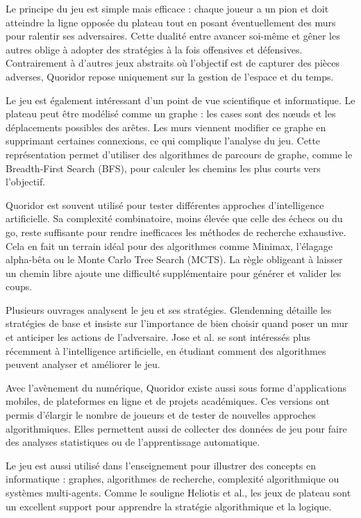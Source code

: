 \documentclass[a4paper]{article}
\begin{document}
Le principe du jeu est simple mais efficace : chaque joueur a un pion et doit atteindre la ligne opposée du plateau tout en posant éventuellement des murs pour ralentir ses adversaires. Cette dualité entre avancer soi-même et gêner les autres oblige à adopter des stratégies à la fois offensives et défensives. Contrairement à d’autres jeux abstraits où l’objectif est de capturer des pièces adverses, Quoridor repose uniquement sur la gestion de l’espace et du temps.

Le jeu est également intéressant d’un point de vue scientifique et informatique. Le plateau peut être modélisé comme un graphe : les cases sont des nœuds et les déplacements possibles des arêtes. Les murs viennent modifier ce graphe en supprimant certaines connexions, ce qui complique l’analyse du jeu. Cette représentation permet d’utiliser des algorithmes de parcours de graphe, comme le Breadth-First Search (BFS), pour calculer les chemins les plus courts vers l’objectif.

Quoridor est souvent utilisé pour tester différentes approches d’intelligence artificielle. Sa complexité combinatoire, moins élevée que celle des échecs ou du go, reste suffisante pour rendre inefficaces les méthodes de recherche exhaustive. Cela en fait un terrain idéal pour des algorithmes comme Minimax, l’élagage alpha-bêta ou le Monte Carlo Tree Search (MCTS). La règle obligeant à laisser un chemin libre ajoute une difficulté supplémentaire pour générer et valider les coups.

Plusieurs ouvrages analysent le jeu et ses stratégies. Glendenning\cite{Glendenning2002MasteringQ} détaille les stratégies de base et insiste sur l’importance de bien choisir quand poser un mur et anticiper les actions de l’adversaire. Jose et al.\cite{jose2022quoridorai} se sont intéressés plus récemment à l’intelligence artificielle, en étudiant comment des algorithmes peuvent analyser et améliorer le jeu.

Avec l’avènement du numérique, Quoridor existe aussi sous forme d’applications mobiles, de plateformes en ligne et de projets académiques. Ces versions ont permis d’élargir le nombre de joueurs et de tester de nouvelles approches algorithmiques. Elles permettent aussi de collecter des données de jeu pour faire des analyses statistiques ou de l’apprentissage automatique.

Le jeu est aussi utilisé dans l’enseignement pour illustrer des concepts en informatique : graphes, algorithmes de recherche, complexité algorithmique ou systèmes multi-agents. Comme le souligne Heliotis et al.\cite{bezakova2014}, les jeux de plateau sont un excellent support pour apprendre la stratégie algorithmique et la logique.
\end{document}
